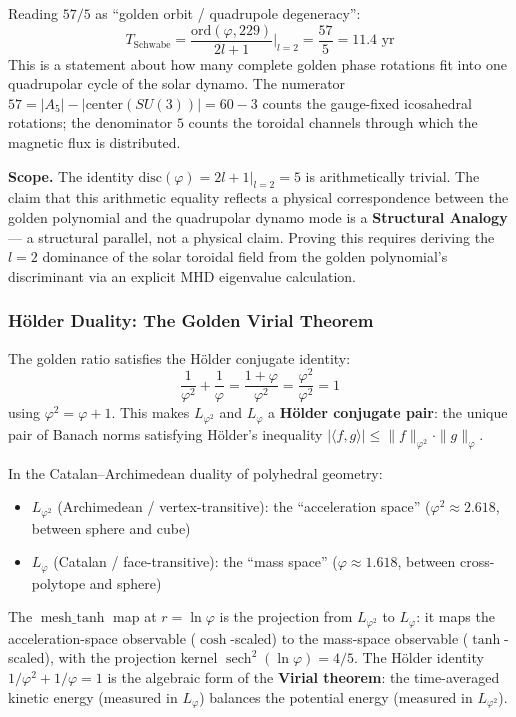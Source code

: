 Reading $57/5$ as ``golden orbit / quadrupole degeneracy'':
\begin{equation}
    T_{\text{Schwabe}} = \frac{\mathrm{ord}(\varphi, 229)}{2l + 1}\bigg|_{l=2} = \frac{57}{5} = 11.4 \text{ yr}
\end{equation}
This is a statement about how many complete golden phase rotations fit into one quadrupolar cycle of the solar dynamo. The numerator $57 = |A_5| - |\mathrm{center}(SU(3))| = 60 - 3$ counts the gauge-fixed icosahedral rotations; the denominator $5$ counts the toroidal channels through which the magnetic flux is distributed.

\textbf{Scope.} The identity $\mathrm{disc}(\varphi) = 2l+1|_{l=2} = 5$ is arithmetically trivial. The claim that this arithmetic equality reflects a physical correspondence between the golden polynomial and the quadrupolar dynamo mode is a \textbf{Structural Analogy} --- a structural parallel, not a physical claim. Proving this requires deriving the $l = 2$ dominance of the solar toroidal field from the golden polynomial's discriminant via an explicit MHD eigenvalue calculation.

\subsubsection{H\"{o}lder Duality: The Golden Virial Theorem}

The golden ratio satisfies the H\"{o}lder conjugate identity:
\begin{equation}
    \frac{1}{\varphi^2} + \frac{1}{\varphi} = \frac{1 + \varphi}{\varphi^2} = \frac{\varphi^2}{\varphi^2} = 1
\end{equation}
using $\varphi^2 = \varphi + 1$. This makes $L_{\varphi^2}$ and $L_\varphi$ a \textbf{H\"{o}lder conjugate pair}: the unique pair of Banach norms satisfying H\"{o}lder's inequality $|\langle f, g \rangle| \leq \|f\|_{\varphi^2} \cdot \|g\|_\varphi$.

In the Catalan--Archimedean duality of polyhedral geometry:
\begin{itemize}[noitemsep]
    \item $L_{\varphi^2}$ (Archimedean / vertex-transitive): the ``acceleration space'' ($\varphi^2 \approx 2.618$, between sphere and cube)
    \item $L_\varphi$ (Catalan / face-transitive): the ``mass space'' ($\varphi \approx 1.618$, between cross-polytope and sphere)
\end{itemize}

The $\operatorname{mesh\_tanh}$ map at $r = \ln\varphi$ is the projection from $L_{\varphi^2}$ to $L_\varphi$: it maps the acceleration-space observable ($\cosh$-scaled) to the mass-space observable ($\tanh$-scaled), with the projection kernel $\operatorname{sech}^2(\ln\varphi) = 4/5$. The H\"{o}lder identity $1/\varphi^2 + 1/\varphi = 1$ is the algebraic form of the \textbf{Virial theorem}: the time-averaged kinetic energy (measured in $L_\varphi$) balances the potential energy (measured in $L_{\varphi^2}$).

